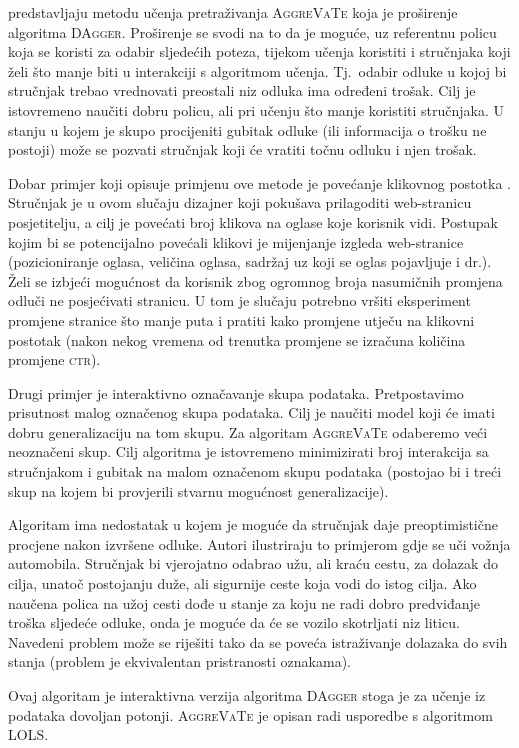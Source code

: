 \citet{ross2014reinforcement} predstavljaju metodu učenja pretraživanja
\textsc{AggreVaTe}  koja je
proširenje algoritma \textsc{DAgger}. Proširenje se svodi na to da je moguće, uz
referentnu policu koja se koristi za odabir sljedećih poteza, tijekom učenja
koristiti i stručnjaka koji želi što manje biti u interakciji s algoritmom
učenja. Tj.~odabir odluke u kojoj bi stručnjak trebao vrednovati preostali
niz odluka ima određeni trošak. Cilj je istovremeno naučiti dobru policu, ali
pri učenju što manje koristiti stručnjaka. U stanju u kojem je skupo procijeniti
gubitak odluke (ili informacija o trošku ne postoji) može se pozvati stručnjak
koji će vratiti točnu odluku i njen trošak.

Dobar primjer koji opisuje primjenu ove metode je povećanje klikovnog postotka
. Stručnjak je u ovom slučaju dizajner koji
pokušava prilagoditi web-stranicu posjetitelju, a cilj je povećati broj klikova
na oglase koje korisnik vidi. Postupak kojim bi se potencijalno povećali klikovi
je mijenjanje izgleda web-stranice (pozicioniranje oglasa, veličina oglasa,
sadržaj uz koji se oglas pojavljuje i dr.). Želi se izbjeći mogućnost da
korisnik zbog ogromnog broja nasumičnih promjena odluči ne posjećivati stranicu.
U tom je slučaju potrebno vršiti eksperiment promjene stranice što manje puta i
pratiti kako promjene utječu na klikovni postotak (nakon nekog vremena od
trenutka promjene se izračuna količina promjene \textsc{ctr}).

Drugi primjer je interaktivno označavanje skupa podataka. Pretpostavimo
prisutnost malog označenog skupa podataka. Cilj je naučiti model koji će imati
dobru generalizaciju na tom skupu. Za algoritam \textsc{AggreVaTe} odaberemo
veći neoznačeni skup. Cilj algoritma je istovremeno minimizirati broj
interakcija sa stručnjakom i gubitak na malom označenom skupu podataka (postojao
bi i treći skup na kojem bi provjerili stvarnu mogućnost generalizacije).

Algoritam ima nedostatak u kojem je moguće da stručnjak daje preoptimistične
procjene nakon izvršene odluke. Autori ilustriraju to primjerom gdje se uči
vožnja automobila. Stručnjak bi vjerojatno odabrao užu, ali kraću cestu, za
dolazak do cilja, unatoč postojanju duže, ali sigurnije ceste koja vodi do istog
cilja. Ako naučena polica na užoj cesti dođe u stanje za koju ne radi dobro
predviđanje troška sljedeće odluke, onda je moguće da će se vozilo skotrljati
niz liticu. Navedeni problem može se riješiti tako da se poveća istraživanje
dolazaka do svih stanja (problem je ekvivalentan pristranosti oznakama).

Ovaj algoritam je interaktivna verzija algoritma \textsc{DAgger} stoga je za
učenje iz podataka dovoljan potonji. \textsc{AggreVaTe} je opisan radi usporedbe
s algoritmom \textsc{LOLS}.
